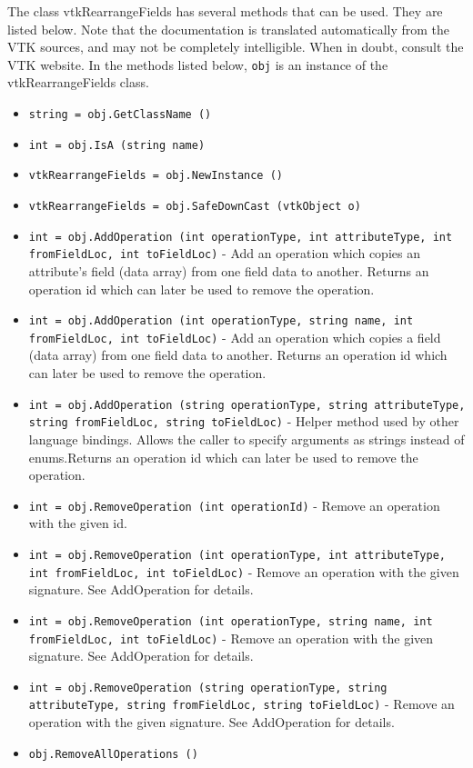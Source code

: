 The class vtkRearrangeFields has several methods that can be used.
  They are listed below.
Note that the documentation is translated automatically from the VTK sources,
and may not be completely intelligible.  When in doubt, consult the VTK website.
In the methods listed below, \verb|obj| is an instance of the vtkRearrangeFields class.
\begin{itemize}
\item  \verb|string = obj.GetClassName ()|

\item  \verb|int = obj.IsA (string name)|

\item  \verb|vtkRearrangeFields = obj.NewInstance ()|

\item  \verb|vtkRearrangeFields = obj.SafeDownCast (vtkObject o)|

\item  \verb|int = obj.AddOperation (int operationType, int attributeType, int fromFieldLoc, int toFieldLoc)| -  Add an operation which copies an attribute's field (data array) from
 one field data to another. Returns an operation id which can later
 be used to remove the operation.

\item  \verb|int = obj.AddOperation (int operationType, string name, int fromFieldLoc, int toFieldLoc)| -  Add an operation which copies a field (data array) from one field 
 data to another. Returns an operation id which can later
 be used to remove the operation.

\item  \verb|int = obj.AddOperation (string operationType, string attributeType, string fromFieldLoc, string toFieldLoc)| -  Helper method used by other language bindings. Allows the caller to
 specify arguments as strings instead of enums.Returns an operation id 
 which can later be used to remove the operation.

\item  \verb|int = obj.RemoveOperation (int operationId)| -  Remove an operation with the given id.

\item  \verb|int = obj.RemoveOperation (int operationType, int attributeType, int fromFieldLoc, int toFieldLoc)| -  Remove an operation with the given signature. See AddOperation
 for details.

\item  \verb|int = obj.RemoveOperation (int operationType, string name, int fromFieldLoc, int toFieldLoc)| -  Remove an operation with the given signature. See AddOperation
 for details.

\item  \verb|int = obj.RemoveOperation (string operationType, string attributeType, string fromFieldLoc, string toFieldLoc)| -  Remove an operation with the given signature. See AddOperation
 for details.

\item  \verb|obj.RemoveAllOperations ()|

\end{itemize}
